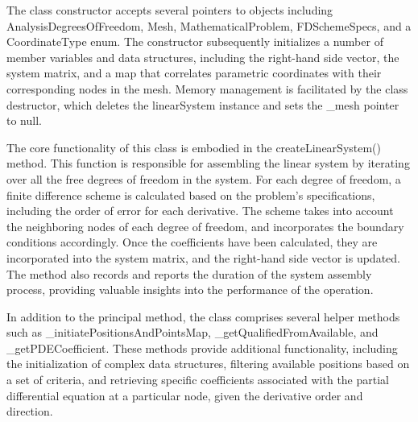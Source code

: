 \documentclass{article}
\begin{document}
 	
 	The class constructor accepts several pointers to objects including AnalysisDegreesOfFreedom, Mesh, MathematicalProblem, FDSchemeSpecs, and a CoordinateType enum. The constructor subsequently initializes a number of member variables and data structures, including the right-hand side vector, the system matrix, and a map that correlates parametric coordinates with their corresponding nodes in the mesh. Memory management is facilitated by the class destructor, which deletes the linearSystem instance and sets the _mesh pointer to null.
 	
 	The core functionality of this class is embodied in the createLinearSystem() method. This function is responsible for assembling the linear system by iterating over all the free degrees of freedom in the system. For each degree of freedom, a finite difference scheme is calculated based on the problem's specifications, including the order of error for each derivative. The scheme takes into account the neighboring nodes of each degree of freedom, and incorporates the boundary conditions accordingly. Once the coefficients have been calculated, they are incorporated into the system matrix, and the right-hand side vector is updated. The method also records and reports the duration of the system assembly process, providing valuable insights into the performance of the operation.
 	
 	In addition to the principal method, the class comprises several helper methods such as _initiatePositionsAndPointsMap, _getQualifiedFromAvailable, and _getPDECoefficient. These methods provide additional functionality, including the initialization of complex data structures, filtering available positions based on a set of criteria, and retrieving specific coefficients associated with the partial differential equation at a particular node, given the derivative order and direction.	
	
	
	
\end{document}
